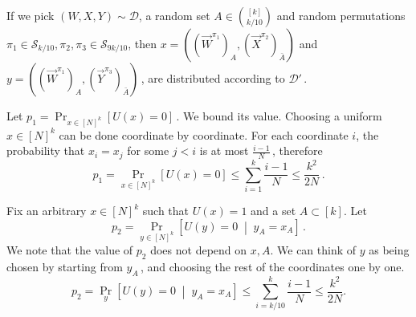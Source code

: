 \documentclass[11pt]{article}
\numberwithin{equation}{section}
\theoremstyle{definition}
\theoremstyle{plain}
\newcommand{\Prob}[2][]{\Pr_{{#1}}\left[#2\right]} %
\newcommand{\brac}[1]{[#1]} %
\newcommand{\given}{\;\middle\vert\;} %
\newcommand\rest[1]{{\bar{#1}}}  %
\begin{document}
If we pick $(W,X,Y)\sim\mathcal{D}$, a random set $A\in\binom{[k]}{k/10}$ and  random permutations 
$\pi_1\in \mathcal{S}_{k/10},\pi_2,\pi_3\in \mathcal{S}_{9k/10}$, %
then $x=((\vec W^{\pi_1})_A,(\vec X^{\pi_2})_\rest{A})$ and $y=((\vec W^{\pi_1})_A,(\vec Y^{\pi_3})_\rest{A})$\,, are distributed according to $\mathcal{D}'$\,.


Let $p_1 = \Prob[x\in\brac{N}^k]{U(x)=0}$\,. We bound its value. Choosing a uniform $x\in[N]^k$ can be done coordinate by coordinate. For each coordinate $i$, the probability that $x_i=x_j$ for some $j<i$ is at most $\frac{i-1}{N}$\,, therefore
\[ p_1 =  \Prob[x\in\brac{N}^k]{U(x)=0} \leq \sum_{i=1}^{k}\frac{i-1}{N}\leq\frac{k^2}{2N}\,. \]%

Fix an arbitrary $x\in[N]^k$ such that $U(x)=1$ and a set $A\subset[k]$.
Let
%
\[p_2 = \Prob[{y\in [N]^k}]{U(y)=0\given y_A=x_A}\,.\]  %
We note that the value of $p_2$ does not depend on $x,A$. We can think of $y$ as being chosen by starting from $y_A$\,, and choosing the rest of the coordinates one by one.
\[ p_2 = \Prob[y]{U(y)=0\given y_A=x_A} \leq \sum_{i=k/10}^{k}\frac{i-1}{N}\leq \frac{k^2}{2N}. \]
\end{document}
